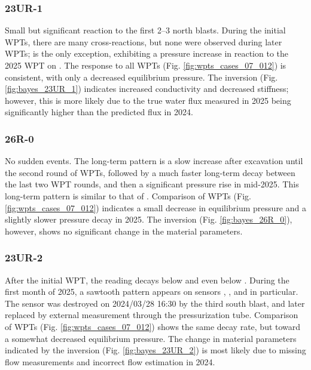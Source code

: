 \subsubsection{23UR-1}
Small but significant reaction to the first 2--3 north blasts. During
the initial WPTs, there are many cross-reactions, but none were observed
during later WPTs;  is the only exception, exhibiting a pressure increase
in reaction to the 2025 WPT on . The response to all WPTs
(Fig. \ref{fig:wpts_cases_07_012}) is consistent, with only a decreased
equilibrium pressure. The inversion (Fig. \ref{fig:bayes_23UR_1})
indicates increased conductivity and decreased stiffness; however, this
is more likely due to the true water flux measured in 2025 being
significantly higher than the predicted flux in 2024.

\subsubsection{26R-0}
No sudden events. The long-term pattern is a slow increase after
excavation until the second round of WPTs, followed by a much faster
long-term decay between the last two WPT rounds, and then a significant
pressure rise in mid-2025. This long-term pattern is similar to that of
. Comparison of WPTs (Fig. \ref{fig:wpts_cases_07_012})
indicates a small decrease in equilibrium pressure and a slightly slower
pressure decay in 2025. The inversion (Fig. \ref{fig:bayes_26R_0}),
however, shows no significant change in the material parameters.

\subsubsection{23UR-2}
After the initial WPT, the reading decays below  and even
below . During the first month of 2025, a sawtooth pattern
appears on sensors , , and  in particular.
The sensor was destroyed on 2024/03/28 16:30 by
the third south blast, and later replaced by external measurement
through the pressurization tube. Comparison of WPTs
(Fig. \ref{fig:wpts_cases_07_012}) shows the same decay rate, but toward
a somewhat decreased equilibrium pressure. The change in material
parameters indicated by the inversion (Fig. \ref{fig:bayes_23UR_2}) is
most likely due to missing flow measurements and incorrect flow estimation in 2024.

